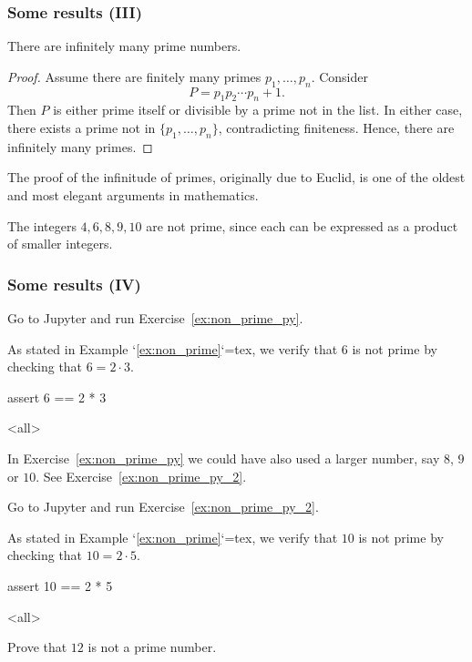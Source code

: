 \begin{frame}
\frametitle{Some results (III)}
\begin{proposition}
There are infinitely many prime numbers.
\end{proposition}

\begin{proof}
Assume there are finitely many primes \(p_1,\dots,p_n\). Consider
\[
P = p_1 p_2 \cdots p_n + 1.
\]
Then \(P\) is either prime itself or divisible by a prime not in the list. In either case, there exists a prime not in \(\{p_1,\dots,p_n\}\), contradicting finiteness. Hence, there are infinitely many primes.
\end{proof}

\begin{remark}[Euclid]
The proof of the infinitude of primes, originally due to Euclid, is one of the oldest and most elegant arguments in mathematics.
\end{remark}

\begin{example}
The integers $4, 6, 8, 9, 10$ are not prime, since each can be expressed as a product of smaller integers.
\label{ex:non_prime}
\end{example}
\end{frame}

\begin{frame}
\frametitle{Some results (IV)}
\begin{pyexercise}{Go to Jupyter and run Exercise~\ref{ex:non_prime_py}.}
\begin{mdcell}
As stated in Example `\ref{ex:non_prime}`{=tex}, we verify that $6$ is not prime by checking that $6 = 2 \cdot 3$.
\end{mdcell}
\begin{pycell}
assert 6 == 2 * 3
\end{pycell}
\mode<all>
\label{ex:non_prime_py}
\end{pyexercise}

\begin{remark}
In Exercise~\ref{ex:non_prime_py} we could have also used a larger number, say $8$, $9$ or $10$. See Exercise~\ref{ex:non_prime_py_2}.
\end{remark}

\begin{pyexercise}{Go to Jupyter and run Exercise~\ref{ex:non_prime_py_2}.}
\begin{mdcell}
As stated in Example `\ref{ex:non_prime}`{=tex}, we verify that $10$ is not prime by checking that $10 = 2 \cdot 5$.
\end{mdcell}
\begin{pycell}
assert 10 == 2 * 5
\end{pycell}
\mode<all>
\label{ex:non_prime_py_2}
\end{pyexercise}

\begin{homework}
Prove that $12$ is not a prime number.
\end{homework}

\end{frame}
